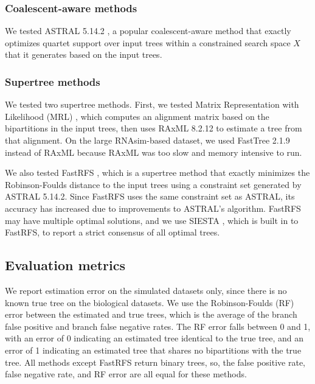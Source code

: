 \subsubsection{Coalescent-aware methods}

We tested ASTRAL 5.14.2 \cite{ASTRAL-MP}, a popular coalescent-aware method that exactly optimizes quartet support over input trees within a constrained search space $X$ that it generates based on the input trees.

\subsubsection{Supertree methods}

We tested two supertree methods. First, we tested Matrix Representation with Likelihood (MRL) \cite{mrl}, which computes an alignment matrix based on the bipartitions in the input trees, then uses RAxML 8.2.12 \cite{stamatakis2014raxml} to estimate a tree from that alignment. On the large RNAsim-based dataset, we used FastTree 2.1.9 \cite{price2010fasttree} instead of RAxML because RAxML was too slow and memory intensive to run.

We also tested FastRFS \cite{fastrfs}, which is a supertree method that exactly minimizes the Robinson-Foulds distance to the input trees using a constraint set generated by ASTRAL 5.14.2. Since FastRFS uses the same constraint set as ASTRAL, its accuracy has increased due to improvements to ASTRAL's algorithm. FastRFS may have multiple optimal solutions, and we use SIESTA \cite{vachaspati2017enhancing}, which is built in to FastRFS, to report a strict consensus of all optimal trees. 

\subsection{Evaluation metrics}

We report estimation error on the simulated datasets only, since there is no known true tree on the biological datasets. We use the Robinson-Foulds (RF) error  between the estimated and true trees, which is the average of the branch false positive and branch false negative rates. The RF error falls between 0 and 1, with an error of 0 indicating an estimated tree identical to the true tree, and an error of 1 indicating an estimated tree that shares no bipartitions with the true tree. All methods except FastRFS return binary trees, so, the false positive rate, false negative rate, and RF error are all equal for these methods.


